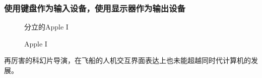 \subsubsection{使用键盘作为输入设备，使用显示器作为输出设备}

\begin{figure}[htb]
  \begin{minipage}[t]{0.5\textwidth}
    \centering
    \caption{分立的Apple I}
    \label{fig:apple-1-modules}
  \end{minipage}
  \begin{minipage}[t]{0.5\textwidth}
    \centering
    \caption{Apple I}
    \label{fig:apple-1}
  \end{minipage}
\end{figure}

再厉害的科幻片导演，在飞船的人机交互界面表达上也未能超越同时代计算机的发展。

